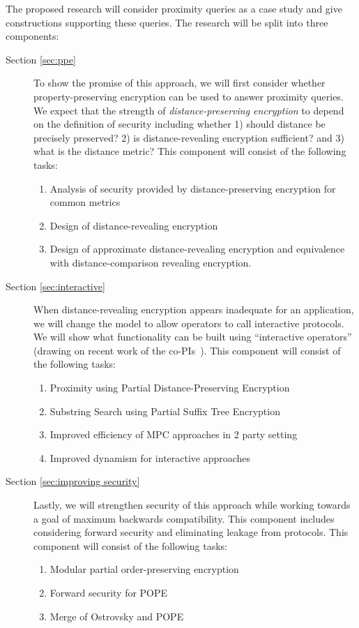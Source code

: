 \noindent
The proposed research will
consider proximity queries as a case study and give constructions supporting
these queries.  The research will be split into three components:
\begin{description}
\item[Section \ref{sec:ppe}] To show the promise of this approach, we will first consider whether property-preserving encryption can be used to answer proximity queries.  We expect that the strength of \emph{distance-preserving encryption} to depend on the definition of security including whether 1) should distance be precisely preserved? 2) is distance-revealing encryption sufficient? and 3) what is the distance metric? This component will consist of the following tasks:
\begin{enumerate}
\item Analysis of security provided by distance-preserving encryption for common metrics
\item Design of distance-revealing encryption
\item Design of approximate distance-revealing encryption and equivalence with distance-comparison revealing encryption.
\end{enumerate}

\item[Section \ref{sec:interactive}] When distance-revealing encryption appears inadequate for an application, we will change the model to allow operators to call interactive protocols.  We will show what functionality can be built using ``interactive operators'' (drawing on recent work of the co-PIs~\cite{SP:PKVKMC14,CCS:RACY16}).  This component will consist of the following tasks:
\begin{enumerate}
\item Proximity using Partial Distance-Preserving Encryption
\item Substring Search using Partial Suffix Tree Encryption
\item Improved efficiency of MPC approaches in 2 party setting
\item Improved dynamism for interactive approaches
\end{enumerate}

\item[Section \ref{sec:improving security}] Lastly, we will strengthen security of this approach while working towards a goal of maximum backwards compatibility.  This component includes considering forward security and eliminating leakage from protocols. This component will consist of the following tasks:
\begin{enumerate}
\item Modular partial order-preserving encryption
\item Forward security for POPE
\item Merge of Ostrovsky and POPE
\end{enumerate}
\end{description}
